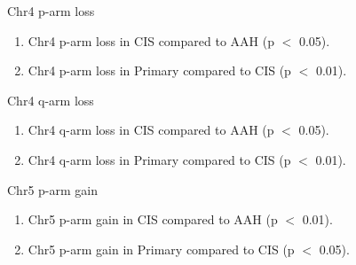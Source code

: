 \documentclass{beamer}
\begin{document}
\begin{frame}[allowframebreaks]
                \begin{block}{Chr4 p-arm loss}
                    \begin{enumerate}
                        \item Chr4 p-arm loss in CIS compared to AAH (p $<$ 0.05).
                        \item Chr4 p-arm loss in Primary compared to CIS (p $<$ 0.01).
                    \end{enumerate}

                    \begin{table}
                        \caption{CGC Tier1 genes in Chr4 p-arm}
                        \resizebox{\linewidth}{!}
                        {}
                    \end{table}
                \end{block}

                \begin{block}{Chr4 q-arm loss}
                    \begin{enumerate}
                        \item Chr4 q-arm loss in CIS compared to AAH (p $<$ 0.05).
                        \item Chr4 q-arm loss in Primary compared to CIS (p $<$ 0.01).
                    \end{enumerate}

                    \begin{table}
                        \caption{CGC Tier1 genes in Chr4 q-arm}
                        \resizebox{\linewidth}{!}
                        {}
                    \end{table}
                \end{block}

                \begin{block}{Chr5 p-arm gain}
                    \begin{enumerate}
                        \item Chr5 p-arm gain in CIS compared to AAH (p $<$ 0.01).
                        \item Chr5 p-arm gain in Primary compared to CIS (p $<$ 0.05).
                    \end{enumerate}

                    \begin{table}
                        \caption{CGC Tier1 genes in Chr5 p-arm}
                        \resizebox{\linewidth}{!}
                        {}
                    \end{table}
                \end{block}


\end{frame}
\end{document}
